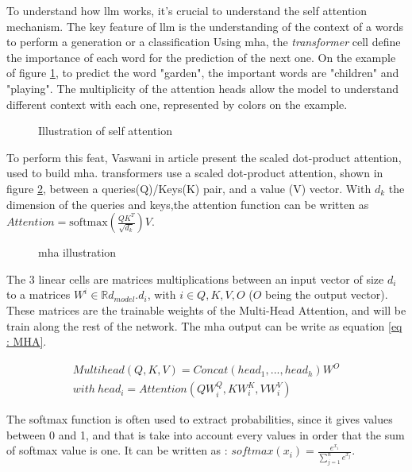 To understand how \acrshort{llm} works, it's crucial to understand the self attention mechanism. The key feature of \acrshort{llm} is the understanding of the context of a words to perform a generation or a classification Using \acrfull{mha}, the \textit{\gls{transformer}} cell define the importance of each word for the prediction of the next one. On the example of figure \ref{fig:self_att}, to predict the word "garden", the important words are "children" and "playing". The multiplicity of the attention heads allow the model to understand different context with each one, represented by colors on the example. 

\begin{figure}[h]
    \centering
    
    \caption{Illustration of self attention}
    \label{fig:self_att}
\end{figure}


To perform this feat, Vaswani in article \cite{vaswani_attention_2017} present the scaled dot-product attention, used to build \acrshort{mha}. \Glspl{transformer} use a scaled dot-product attention, shown in figure \ref{fig:mha}, between a queries(Q)/Keys(K) pair, and a value (V) vector. With $d_k$ the dimension of the queries and keys,the attention function can be written as $Attention = \text{softmax} ( \frac{Q K^T}{\sqrt{d_k}})V$.

\begin{figure}[h]
    \centering
    
    \caption{\acrfull{mha} illustration }
    \label{fig:mha}
\end{figure}

The 3 linear cells are matrices multiplications between an input vector of size $d_i$ to a matrices $W^i \in \mathbb{R}{d_{model} . d_i}$, with $i \in {Q,K,V,O}$ ($O$ being the output vector). These matrices are the trainable weights of the Multi-Head Attention, and will be train along the rest of the network. The \acrshort{mha} output can be write as equation \ref{eq : MHA}. 

\begin{equation}
\begin{split}
 Multihead (Q,K,V) = Concat (head_1,...,head_h)W^O\\
with \ head_i = Attention (Q W_i^Q,K W_i^K,V W_i^V)
\end{split}
\label{eq : MHA}  
\end{equation}

The softmax function is often used to extract probabilities, since it gives values between 0 and 1, and that is take into account every values in order that the sum of softmax value is one. It can be written as : $\displaystyle
softmax(x_i) = \frac{e^{x_i}}{\sum_{j=1}^n e^{x_j}}$.

